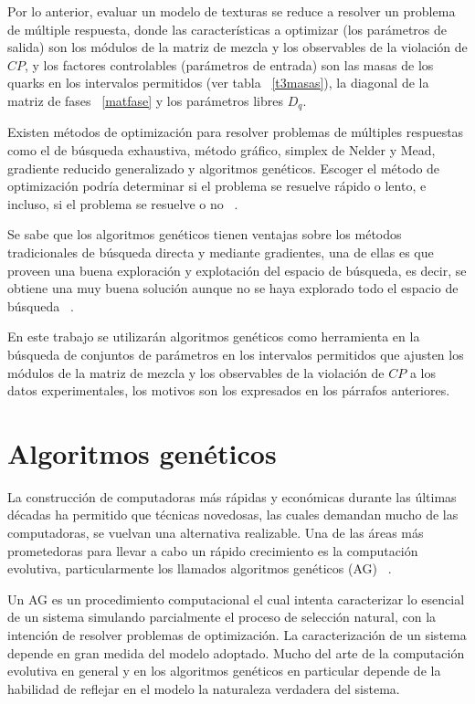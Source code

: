 Por lo anterior, evaluar un modelo de texturas se reduce a resolver un problema
de m\'ultiple respuesta, donde las caracter\'isticas a optimizar (los
par\'ametros de salida) son los m\'odulos de la matriz de mezcla y los
observables de la violaci\'on de $CP$, y los factores controlables
(par\'ametros de entrada) son las masas de los quarks en los intervalos
permitidos (ver tabla ~\ref{t3masas}), la diagonal de la matriz de fases
~\ref{matfase} y los par\'ametros libres $D_q$.

Existen m\'etodos de optimizaci\'on para resolver problemas de m\'ultiples
respuestas como el de b\'usqueda exhaustiva, m\'etodo gr\'afico, simplex de
Nelder y Mead, gradiente reducido generalizado y algoritmos gen\'eticos. Escoger
el m\'etodo de optimizaci\'on podr\'ia determinar si el problema se resuelve
r\'apido o lento, e incluso, si el problema se resuelve o no ~\cite{evaro}.

Se sabe que los algoritmos gen\'eticos tienen ventajas sobre los m\'etodos 
tradicionales de b\'usqueda directa y mediante gradientes, una de ellas es que 
proveen una buena exploraci\'on y explotaci\'on del espacio de b\'usqueda, es 
decir, se obtiene una muy buena soluci\'on aunque no se haya explorado todo el 
espacio de b\'usqueda ~\cite{rayon}. 

En este trabajo se utilizar\'an algoritmos gen\'eticos como herramienta en la 
b\'usqueda de conjuntos de par\'ametros en los intervalos permitidos que  
ajusten los m\'odulos de la matriz de mezcla y los observables de la violaci\'on
de $CP$ a los datos experimentales, los motivos son los expresados en los
p\'arrafos anteriores.
\section{Algoritmos gen\'eticos}
La construcci\'on de computadoras m\'as r\'apidas y econ\'omicas 
durante las \'ultimas d\'ecadas ha permitido que t\'ecnicas novedosas, las 
cuales demandan mucho de las computadoras, se vuelvan una alternativa 
realizable. Una de las \'areas m\'as prometedoras para llevar a cabo un r\'apido
crecimiento es la computaci\'on evolutiva, particularmente los llamados 
algoritmos gen\'eticos (AG) ~\cite{Kur199901}.

Un AG es un procedimiento computacional el cual intenta 
caracterizar lo esencial de un sistema simulando parcialmente el proceso de 
selecci\'on natural, con la intenci\'on de resolver problemas de optimizaci\'on.
La caracterizaci\'on de un sistema depende en gran medida del modelo adoptado. 
Mucho del arte de la computaci\'on evolutiva en general y en los algoritmos 
gen\'eticos en particular depende de la habilidad de reflejar en el modelo la 
naturaleza verdadera del sistema.

